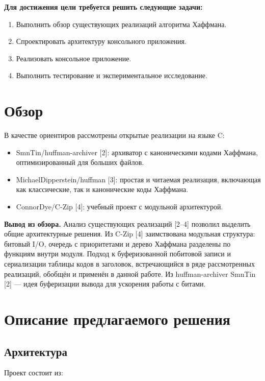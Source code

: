 \documentclass[a4paper]{article}
\begin{document}
\textbf{Для достижения цели требуется решить следующие задачи:}
\begin{enumerate}
    \item Выполнить обзор существующих реализаций алгоритма Хаффмана.
    \item Спроектировать архитектуру консольного приложения.
    \item Реализовать консольное приложение.
    \item Выполнить тестирование и экспериментальное исследование.
\end{enumerate}

\section{Обзор}

В качестве ориентиров рассмотрены открытые реализации на языке C:

\begin{itemize}
    \item SmnTin/huffman-archiver [2]: архиватор с каноническими кодами Хаффмана, оптимизированный для больших файлов.
    \item MichaelDipperstein/huffman [3]: простая и читаемая реализация, включающая как классические, так и канонические коды Хаффмана.
    \item ConnorDye/C-Zip [4]: учебный проект с модульной архитектурой.
\end{itemize}

\textbf{Вывод из обзора.} Анализ существующих реализаций [2–4] позволил выделить общие архитектурные решения. 
Из C-Zip [4] заимствована модульная структура: битовый I/O, очередь с приоритетами и дерево Хаффмана 
разделены по функциям внутри модуля. Подход к буферизованной побитовой записи и сериализации таблицы кодов в заголовок, 
встречающийся в ряде рассмотренных реализаций, обобщён и применён в данной работе.
Из huffman-archiver SmnTin [2] — идея буферизации вывода для ускорения работы с битами.

\section{Описание предлагаемого решения}

\subsection{Архитектура}

Проект состоит из:
\end{document}
